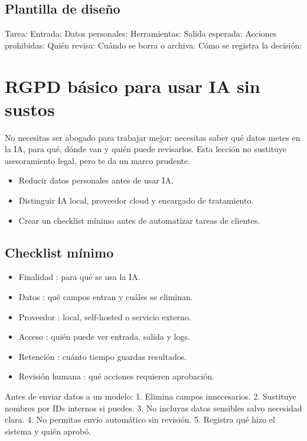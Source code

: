 \documentclass[11pt,a4paper]{book}
\begin{document}
\section{Plantilla de diseño}
\begin{codebox}
Tarea:
Entrada:
Datos personales:
Herramientas:
Salida esperada:
Acciones prohibidas:
Quién revisa:
Cuándo se borra o archiva:
Cómo se registra la decisión:
\end{codebox}
\chapter{RGPD básico para usar IA sin sustos}
No necesitas ser abogado para trabajar mejor: necesitas saber qué datos metes en la IA, para qué, dónde van y quién puede revisarlos. Esta lección no sustituye asesoramiento legal, pero te da un marco prudente.

\begin{itemize}\item Reducir datos personales antes de usar IA.\end{itemize}
\begin{itemize}\item Distinguir IA local, proveedor cloud y encargado de tratamiento.\end{itemize}
\begin{itemize}\item Crear un checklist mínimo antes de automatizar tareas de clientes.\end{itemize}
\section{Checklist mínimo}
\begin{itemize}\item Finalidad : para qué se usa la IA.\end{itemize}
\begin{itemize}\item Datos : qué campos entran y cuáles se eliminan.\end{itemize}
\begin{itemize}\item Proveedor : local, self-hosted o servicio externo.\end{itemize}
\begin{itemize}\item Acceso : quién puede ver entrada, salida y logs.\end{itemize}
\begin{itemize}\item Retención : cuánto tiempo guardas resultados.\end{itemize}
\begin{itemize}\item Revisión humana : qué acciones requieren aprobación.\end{itemize}
\begin{codebox}
Antes de enviar datos a un modelo:
1. Elimina campos innecesarios.
2. Sustituye nombres por IDs internos si puedes.
3. No incluyas datos sensibles salvo necesidad clara.
4. No permitas envío automático sin revisión.
5. Registra qué hizo el sistema y quién aprobó.
\end{codebox}
\end{document}
